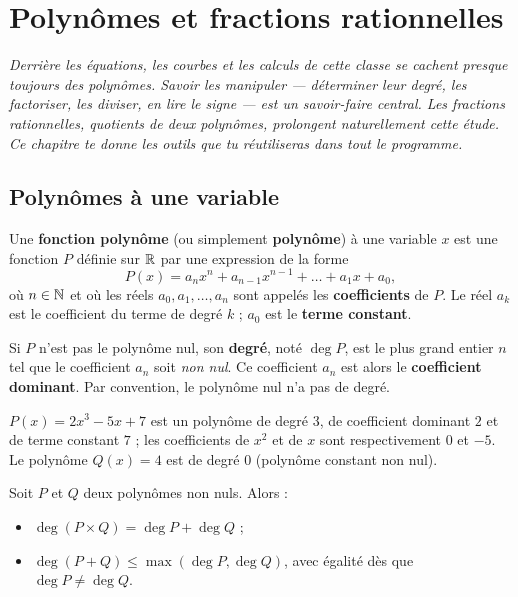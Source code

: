 \chapter{Polynômes et fractions rationnelles}
\textit{Derrière les équations, les courbes et les calculs de cette classe se cachent
presque toujours des polynômes. Savoir les manipuler — déterminer leur degré, les
factoriser, les diviser, en lire le signe — est un savoir-faire central. Les fractions
rationnelles, quotients de deux polynômes, prolongent naturellement cette étude. Ce
chapitre te donne les outils que tu réutiliseras dans tout le programme.}

\section{Polynômes à une variable}

\begin{definition}
Une \textbf{fonction polynôme} (ou simplement \textbf{polynôme}) à une variable $x$ est
une fonction $P$ définie sur $\mathbb{R}$ par une expression de la forme
\[ P(x)=a_n x^n + a_{n-1}x^{n-1}+\dots+a_1 x + a_0, \]
où $n\in\mathbb{N}$ et où les réels $a_0,a_1,\dots,a_n$ sont appelés les \textbf{coefficients}
de $P$. Le réel $a_k$ est le coefficient du terme de degré $k$ ; $a_0$ est le
\textbf{terme constant}.
\end{definition}

\begin{definition}
Si $P$ n'est pas le polynôme nul, son \textbf{degré}, noté $\deg P$, est le plus grand
entier $n$ tel que le coefficient $a_n$ soit \emph{non nul}. Ce coefficient $a_n$ est
alors le \textbf{coefficient dominant}. Par convention, le polynôme nul n'a pas de degré.
\end{definition}

\begin{exemple}
$P(x)=2x^3-5x+7$ est un polynôme de degré $3$, de coefficient dominant $2$ et de terme
constant $7$ ; les coefficients de $x^2$ et de $x$ sont respectivement $0$ et $-5$.
Le polynôme $Q(x)=4$ est de degré $0$ (polynôme constant non nul).
\end{exemple}

\begin{propriete}
Soit $P$ et $Q$ deux polynômes non nuls. Alors :
\begin{itemize}
  \item $\deg(P\times Q)=\deg P + \deg Q$ ;
  \item $\deg(P+Q)\le \max(\deg P,\deg Q)$, avec égalité dès que $\deg P\neq \deg Q$.
\end{itemize}
\end{propriete}

